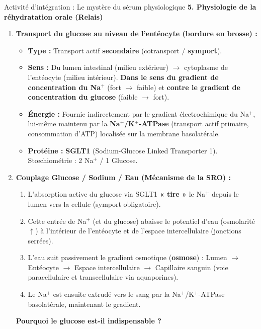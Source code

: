 \documentclass[11pt]{article}
\begin{document}
\begin{exoresolu}{Activité d'intégration : Le mystère du sérum physiologique}
\medskip
\noindent\textbf{5. Physiologie de la réhydratation orale (Relais)}
\begin{enumerate}
    \item \textbf{Transport du glucose au niveau de l'entéocyte (bordure en brosse) :}
    \begin{itemize}
        \item \textbf{Type :} Transport actif \textbf{secondaire} (cotransport / \textbf{symport}).
        \item \textbf{Sens :} Du lumen intestinal (milieu extérieur) $\rightarrow$ cytoplasme de l'entéocyte (milieu intérieur). \textbf{Dans le sens du gradient de concentration du Na$^+$} (fort $\rightarrow$ faible) et \textbf{contre le gradient de concentration du glucose} (faible $\rightarrow$ fort).
        \item \textbf{Énergie :} Fournie indirectement par le gradient électrochimique du Na$^+$, lui-même maintenu par la \textbf{Na$^+$/K$^+$-ATPase} (transport actif primaire, consommation d'ATP) localisée sur la membrane basolatérale.
        \item \textbf{Protéine :} \textbf{SGLT1} (Sodium-Glucose Linked Transporter 1). Stœchiométrie : 2 Na$^+$ / 1 Glucose.
    \end{itemize}
    \item \textbf{Couplage Glucose / Sodium / Eau (Mécanisme de la SRO) :}
    \begin{enumerate}
        \item L'absorption active du glucose via SGLT1 \textbf{« tire »} le Na$^+$ depuis le lumen vers la cellule (symport obligatoire).
        \item Cette entrée de Na$^+$ (et du glucose) abaisse le potentiel d'eau (osmolarité $\uparrow$) à l'intérieur de l'entéocyte et de l'espace intercellulaire (jonctions serrées).
        \item L'eau suit passivement le gradient osmotique (\textbf{osmose}) : Lumen $\rightarrow$ Entéocyte $\rightarrow$ Espace intercellulaire $\rightarrow$ Capillaire sanguin (voie paracellulaire et transcellulaire via aquaporines).
        \item Le Na$^+$ est ensuite extrudé vers le sang par la Na$^+$/K$^+$-ATPase basolatérale, maintenant le gradient.
    \end{enumerate}
    \textbf{Pourquoi le glucose est-il indispensable ?}

\end{enumerate}
\end{exoresolu}
\end{document}

